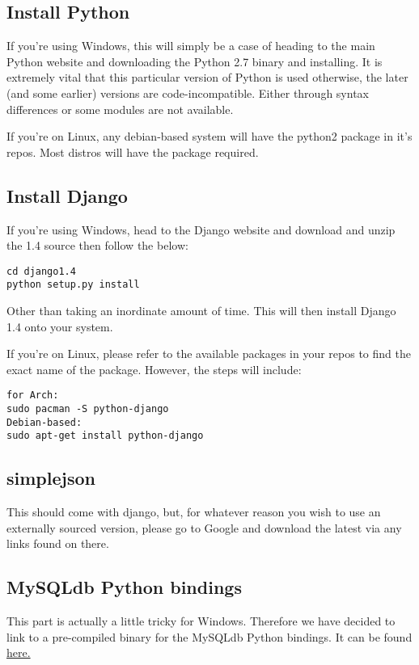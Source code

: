 \documentclass[letterpaper,10pt,english]{sphinxmanual}
\begin{document}
\subsection{Install Python}
\label{deps:install-python}
If you're using Windows, this will simply be a case of heading to the main
Python website and downloading the Python 2.7 binary and installing. It is
extremely vital that this particular version of Python is used otherwise,
the later (and some earlier) versions are code-incompatible. Either through
syntax differences or some modules are not available.

If you're on Linux, any debian-based system will have the python2 package in
it's repos. Most distros will have the package required.


\subsection{Install Django}
\label{deps:install-django}
If you're using Windows, head to the Django website and download and unzip
the 1.4 source then follow the below:

\begin{Verbatim}[commandchars=\\\{\}]
cd django1.4
python setup.py install
\end{Verbatim}

Other than taking an inordinate amount of time. This will then install Django
1.4 onto your system.

If you're on Linux, please refer to the available packages in your repos to
find the exact name of the package. However, the steps will include:

\begin{Verbatim}[commandchars=\\\{\}]
for Arch:
sudo pacman -S python-django
Debian-based:
sudo apt-get install python-django
\end{Verbatim}


\subsection{simplejson}
\label{deps:simplejson}
This should come with django, but, for whatever reason you wish to use an
externally sourced version, please go to Google and download the latest
via any links found on there.


\subsection{MySQLdb Python bindings}
\label{deps:mysqldb-python-bindings}
This part is actually a little tricky for Windows. Therefore we have decided
to link to a pre-compiled binary for the MySQLdb Python bindings. It can be
found \href{http://www.lfd.uci.edu/~gohlke/pythonlibs/}{here.}
\end{document}
